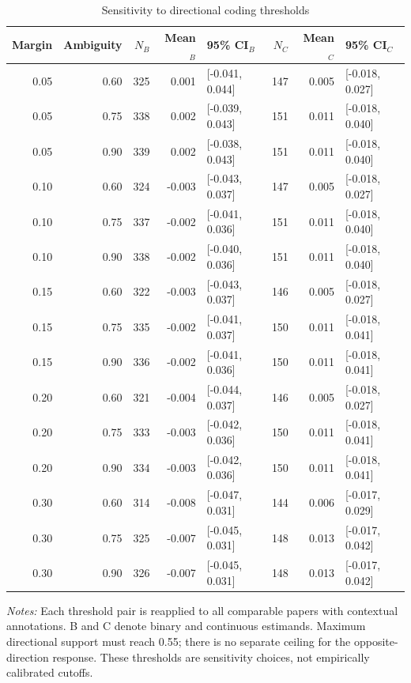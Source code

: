 \begin{table}[htbp]\centering\small
\caption{Sensitivity to directional coding thresholds}\label{tab:thresholds}
\setlength{\tabcolsep}{4pt}
\begin{tabular}{rrrrlrrl}\toprule
Margin & Ambiguity & $N_B$ & Mean$_B$ & 95\% CI$_B$ & $N_C$ & Mean$_C$ & 95\% CI$_C$ \\
\midrule
0.05 & 0.60 & 325 & 0.001 & [-0.041, 0.044] & 147 & 0.005 & [-0.018, 0.027] \\
0.05 & 0.75 & 338 & 0.002 & [-0.039, 0.043] & 151 & 0.011 & [-0.018, 0.040] \\
0.05 & 0.90 & 339 & 0.002 & [-0.038, 0.043] & 151 & 0.011 & [-0.018, 0.040] \\
0.10 & 0.60 & 324 & -0.003 & [-0.043, 0.037] & 147 & 0.005 & [-0.018, 0.027] \\
0.10 & 0.75 & 337 & -0.002 & [-0.041, 0.036] & 151 & 0.011 & [-0.018, 0.040] \\
0.10 & 0.90 & 338 & -0.002 & [-0.040, 0.036] & 151 & 0.011 & [-0.018, 0.040] \\
0.15 & 0.60 & 322 & -0.003 & [-0.043, 0.037] & 146 & 0.005 & [-0.018, 0.027] \\
0.15 & 0.75 & 335 & -0.002 & [-0.041, 0.037] & 150 & 0.011 & [-0.018, 0.041] \\
0.15 & 0.90 & 336 & -0.002 & [-0.041, 0.036] & 150 & 0.011 & [-0.018, 0.041] \\
0.20 & 0.60 & 321 & -0.004 & [-0.044, 0.037] & 146 & 0.005 & [-0.018, 0.027] \\
0.20 & 0.75 & 333 & -0.003 & [-0.042, 0.036] & 150 & 0.011 & [-0.018, 0.041] \\
0.20 & 0.90 & 334 & -0.003 & [-0.042, 0.036] & 150 & 0.011 & [-0.018, 0.041] \\
0.30 & 0.60 & 314 & -0.008 & [-0.047, 0.031] & 144 & 0.006 & [-0.017, 0.029] \\
0.30 & 0.75 & 325 & -0.007 & [-0.045, 0.031] & 148 & 0.013 & [-0.017, 0.042] \\
0.30 & 0.90 & 326 & -0.007 & [-0.045, 0.031] & 148 & 0.013 & [-0.017, 0.042] \\
\bottomrule\end{tabular}
\par\vspace{4pt}\begin{minipage}{\textwidth}\footnotesize
\textit{Notes:} Each threshold pair is reapplied to all comparable papers with contextual annotations. B and C denote binary and continuous estimands. Maximum directional support must reach 0.55; there is no separate ceiling for the opposite-direction response. These thresholds are sensitivity choices, not empirically calibrated cutoffs.
\end{minipage}
\end{table}
